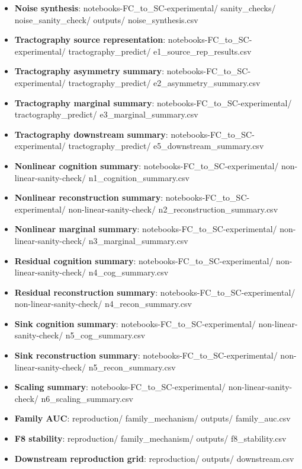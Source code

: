 \begin{itemize}
\item
  \textbf{Noise synthesis}: notebooks-FC\_to\_SC-experimental/ sanity\_checks/ noise\_sanity\_check/ outputs/ noise\_synthesis.csv
\item
  \textbf{Tractography source representation}: notebooks-FC\_to\_SC-experimental/ tractography\_predict/ e1\_source\_rep\_results.csv
\item
  \textbf{Tractography asymmetry summary}: notebooks-FC\_to\_SC-experimental/ tractography\_predict/ e2\_asymmetry\_summary.csv
\item
  \textbf{Tractography marginal summary}: notebooks-FC\_to\_SC-experimental/ tractography\_predict/ e3\_marginal\_summary.csv
\item
  \textbf{Tractography downstream summary}: notebooks-FC\_to\_SC-experimental/ tractography\_predict/ e5\_downstream\_summary.csv
\item
  \textbf{Nonlinear cognition summary}: notebooks-FC\_to\_SC-experimental/ non-linear-sanity-check/ n1\_cognition\_summary.csv
\item
  \textbf{Nonlinear reconstruction summary}: notebooks-FC\_to\_SC-experimental/ non-linear-sanity-check/ n2\_reconstruction\_summary.csv
\item
  \textbf{Nonlinear marginal summary}: notebooks-FC\_to\_SC-experimental/ non-linear-sanity-check/ n3\_marginal\_summary.csv
\item
  \textbf{Residual cognition summary}: notebooks-FC\_to\_SC-experimental/ non-linear-sanity-check/ n4\_cog\_summary.csv
\item
  \textbf{Residual reconstruction summary}: notebooks-FC\_to\_SC-experimental/ non-linear-sanity-check/ n4\_recon\_summary.csv
\item
  \textbf{Sink cognition summary}: notebooks-FC\_to\_SC-experimental/ non-linear-sanity-check/ n5\_cog\_summary.csv
\item
  \textbf{Sink reconstruction summary}: notebooks-FC\_to\_SC-experimental/ non-linear-sanity-check/ n5\_recon\_summary.csv
\item
  \textbf{Scaling summary}: notebooks-FC\_to\_SC-experimental/ non-linear-sanity-check/ n6\_scaling\_summary.csv
\item
  \textbf{Family AUC}: reproduction/ family\_mechanism/ outputs/ family\_auc.csv
\item
  \textbf{F8 stability}: reproduction/ family\_mechanism/ outputs/ f8\_stability.csv
\item
  \textbf{Downstream reproduction grid}: reproduction/ outputs/ downstream.csv

\end{itemize}
